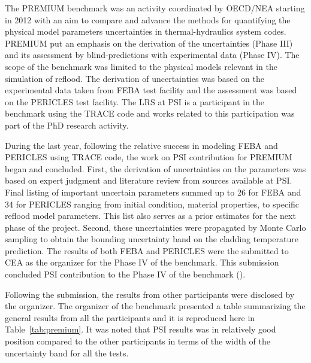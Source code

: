\documentclass[11pt,titlepage]{article}
\begin{document}
The PREMIUM benchmark was an activity coordinated by OECD/NEA starting in 2012 
with an aim to compare and advance the methods for quantifying the physical 
model parameters uncertainties in thermal-hydraulics system codes.
PREMIUM put an emphasis on the derivation of the uncertainties (Phase III) and 
its assessment by blind-predictions with experimental data (Phase IV).
The scope of the benchmark was limited to the physical models relevant in the 
simulation of reflood.
The derivation of uncertainties was based on the experimental data taken from 
FEBA test facility and the assessment was based on the PERICLES test facility.
The LRS at PSI is a participant in the benchmark using the TRACE code and 
works related to this participation was part of the PhD research activity.

During the last year, following the relative success in modeling FEBA and 
PERICLES using TRACE code, the work on PSI contribution for PREMIUM began 
and concluded.
First, the derivation of uncertainties on the parameters was based on expert 
judgment and literature review from sources available at PSI.
Final listing of important uncertain parameters summed up to 26 for FEBA and 
34 for PERICLES ranging from initial condition, material properties, to 
specific reflood model parameters.
This list also serves as a prior estimates for the next phase of the project.
Second, these uncertainties were propagated by Monte Carlo sampling to obtain
the bounding uncertainty band on the cladding temperature prediction.
The results of both FEBA and PERICLES were the submitted to CEA as the 
organizer for the Phase IV of the benchmark. 
This submission concluded PSI contribution to the Phase IV of the benchmark 
(\cite{Wicaksono2014a, Wicaksono2014c}).

Following the submission, the results from other participants were disclosed by
the organizer.
The organizer of the benchmark presented a table summarizing the general 
results from all the participants and it is reproduced here in 
Table~\ref{tab:premium}.
It was noted that PSI results was in relatively good position compared to the
other participants in terms of the width of the uncertainty band for all the 
tests.
\end{document}
